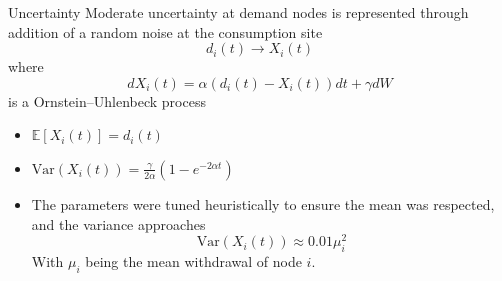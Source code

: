 \begin{frame}{Uncertainty}
  Moderate uncertainty at demand nodes is represented through addition of a random noise at the consumption site
  \begin{equation}
    d_i(t) \to X_i(t)
  \end{equation}
  where
  \begin{equation}
    dX_i(t) = \alpha(d_i(t) - X_i(t))dt + \gamma dW
  \end{equation}
  is a Ornstein–Uhlenbeck process
  \begin{itemize}
  \item $\mathbb{E}[X_i(t)] = d_i(t)$
    \vspace{0.1cm}
  \item $ \text{Var}(X_i(t)) = \frac{\gamma}{2\alpha}\left(1 - e^{-2\alpha t} \right) $
    \vspace{0.1cm}
  \item The parameters were tuned heuristically to ensure the mean was respected, and the variance approaches
    \begin{equation}
      \text{Var}(X_i(t)) \approx 0.01 \mu_i^2
    \end{equation}
    With $\mu_i$ being the mean withdrawal of node $i$.
  \end{itemize}

\end{frame}


